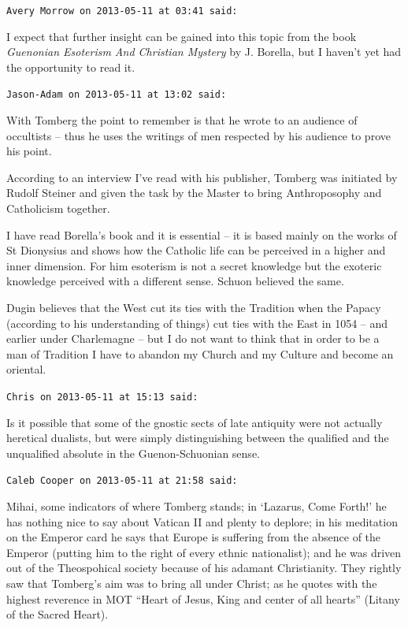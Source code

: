 \begin{footnotesize}
\begin{sffamily}
\hfill

\texttt{Avery Morrow on 2013-05-11 at 03:41 said:}

I expect that further insight can be gained into this topic from the book \emph{Guenonian Esoterism And Christian Mystery} by J. Borella, but I haven't yet had the opportunity to read it.

\hfill

\texttt{Jason-Adam on 2013-05-11 at 13:02 said:}

With Tomberg the point to remember is that he wrote to an audience of occultists -- thus he uses the writings of men respected by his audience to prove his point.

According to an interview I've read with his publisher, Tomberg was initiated by Rudolf Steiner and given the task by the Master to bring Anthroposophy and Catholicism together.

I have read Borella's book and it is essential -- it is based mainly on the works of St Dionysius and shows how the Catholic life can be perceived in a higher and inner dimension. For him esoterism is not a secret knowledge but the exoteric knowledge perceived with a different sense. Schuon believed the same.

Dugin believes that the West cut its ties with the Tradition when the Papacy (according to his understanding of things) cut ties with the East in 1054 -- and earlier under Charlemagne -- but I do not want to think that in order to be a man of Tradition I have to abandon my Church and my Culture and become an oriental.

\hfill

\texttt{Chris on 2013-05-11 at 15:13 said:}

Is it possible that some of the gnostic sects of late antiquity were not actually heretical dualists, but were simply distinguishing between the qualified and the unqualified absolute in the Guenon-Schuonian sense.

\hfill

\texttt{Caleb Cooper on 2013-05-11 at 21:58 said:}

Mihai, some indicators of where Tomberg stands; in `Lazarus, Come Forth!' he has nothing nice to say about Vatican II and plenty to deplore; in his meditation on the Emperor card he says that Europe is suffering from the absence of the Emperor (putting him to the right of every ethnic nationalist); and he was driven out of the Theospohical society because of his adamant Christianity. They rightly saw that Tomberg's aim was to bring all under Christ; as he quotes with the highest reverence in MOT ``Heart of Jesus, King and center of all hearts'' (Litany of the Sacred Heart).


\end{sffamily}
\end{footnotesize}
